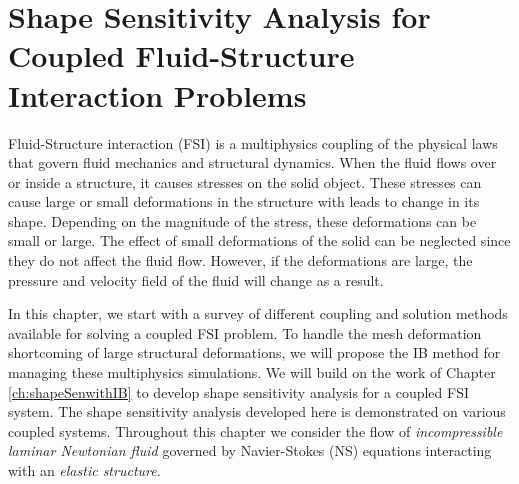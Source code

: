 \chapter{Shape Sensitivity Analysis for Coupled Fluid-Structure Interaction Problems}\label{ch:FSIsen}
Fluid-Structure interaction (FSI) is a multiphysics coupling of the physical laws that govern fluid mechanics and structural dynamics. When the fluid flows over or inside a structure, it causes stresses on the solid object. These stresses can cause large or small deformations in the structure with leads to change in its shape. Depending on the magnitude of the stress, these deformations can be small or large. The effect of small deformations of the solid can be neglected since they do not affect the fluid flow. However, if the deformations are large, the pressure and velocity field of the fluid will change as a result.

In this chapter, we start with a survey of different coupling and solution methods available for solving a coupled FSI problem. To handle the mesh deformation shortcoming of large structural deformations, we will propose the IB method for managing these multiphysics simulations. We will build on the work of Chapter \ref{ch:shapeSenwithIB} to develop shape sensitivity analysis for a coupled FSI system. The shape sensitivity analysis developed here is demonstrated on various coupled systems. Throughout this chapter we consider the flow of \emph{incompressible laminar Newtonian fluid} governed by Navier-Stokes (NS) equations interacting with an \emph{elastic structure}. 



